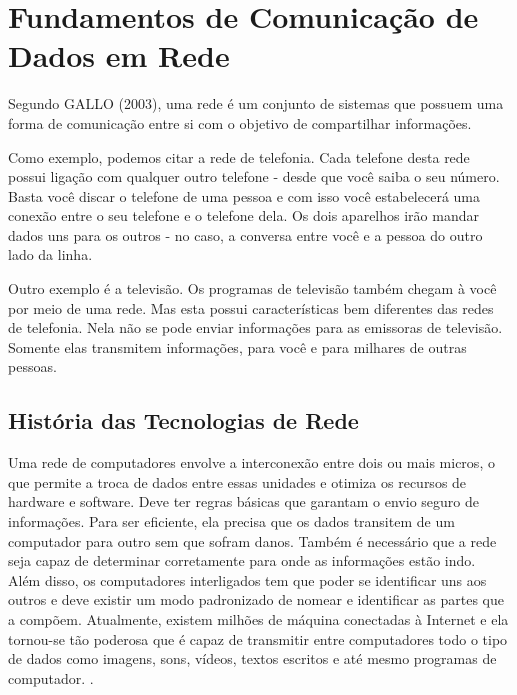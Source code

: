 \section{Fundamentos de Comunicação de Dados em Rede}
Segundo \nocite{gallo2003comunicaccao}GALLO (2003), uma rede é um conjunto de sistemas que possuem uma forma de comunicação entre si com o objetivo de compartilhar informações.

Como exemplo, podemos citar a rede de telefonia. Cada telefone desta rede possui ligação com qualquer outro telefone - desde que você saiba o seu número. Basta você discar o telefone de uma pessoa e com isso você estabelecerá uma conexão entre o seu telefone e o telefone dela. Os dois aparelhos irão mandar dados uns para os outros - no caso, a conversa entre você e a pessoa do outro lado da linha.

Outro exemplo é a televisão. Os programas de televisão também chegam à você por meio de uma rede. Mas esta possui características bem diferentes das redes de telefonia. Nela não se pode enviar informações para as emissoras de televisão. Somente elas transmitem informações, para você e para milhares de outras pessoas.

	\subsection{História das Tecnologias de Rede}
	Uma rede de computadores envolve a interconexão entre dois ou mais micros, o que permite a troca de dados entre essas unidades e otimiza os recursos de hardware e software. Deve ter regras básicas que garantam o envio seguro de informações. Para ser eficiente, ela precisa que os dados transitem de um computador para outro sem que sofram danos. Também é necessário que a rede seja capaz de determinar corretamente para onde as informações estão indo. Além disso, os computadores interligados tem que poder se identificar uns aos outros e deve existir um modo padronizado de nomear e identificar as partes que a compõem. Atualmente, existem milhões de máquina conectadas à Internet e ela tornou-se tão poderosa que é capaz de transmitir entre computadores todo o tipo de dados como imagens, sons, vídeos, textos escritos e até mesmo programas de computador. \cite{forouzan2009comunicaccao}.
	
